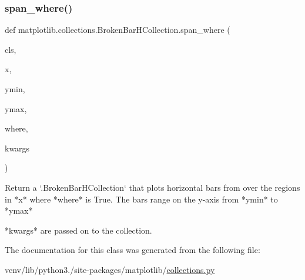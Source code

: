 \subsubsection{\texorpdfstring{span\+\_\+where()}{span\_where()}}
{\footnotesize\ttfamily def matplotlib.\+collections.\+Broken\+Bar\+H\+Collection.\+span\+\_\+where (\begin{DoxyParamCaption}\item[{}]{cls,  }\item[{}]{x,  }\item[{}]{ymin,  }\item[{}]{ymax,  }\item[{}]{where,  }\item[{}]{kwargs }\end{DoxyParamCaption})}

\begin{DoxyVerb}Return a `.BrokenBarHCollection` that plots horizontal bars from
over the regions in *x* where *where* is True.  The bars range
on the y-axis from *ymin* to *ymax*

*kwargs* are passed on to the collection.
\end{DoxyVerb}
 

The documentation for this class was generated from the following file\+:\begin{DoxyCompactItemize}
\item 
venv/lib/python3./site-\/packages/matplotlib/\hyperlink{collections_8py}{collections.\+py}\end{DoxyCompactItemize}
